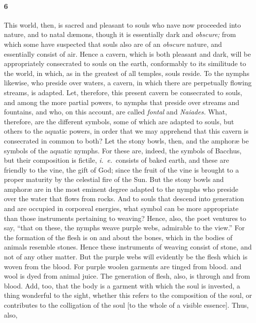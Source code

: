 \documentclass[a4paper,12pt]{article}
\begin{document}
\paragraph{6} This world, then, is sacred and pleasant to souls who nave now
proceeded into nature, and to natal d{\ae}mons, though it is essentially dark
and \textit{obscure;} from which some have suspected that souls also are of an
\textit{obscure} nature, and essentially consist of air. Hence a cavern, which
is both pleasant and dark, will be appropriately consecrated to souls on the
earth, conformably to its similitude to the world, in which, as in the greatest
of all temples, souls reside. To the nymphs likewise, who preside over waters,
a cavern, in which there are perpetually flowing streams, is adapted. Let,
therefore, this present cavern be consecrated to souls, and among the more
partial powers, to nymphs that preside over streams and fountains, and who, on
this account, are called \textit{fontal} and \textit{Naiades.} What, therefore,
are the different symbols, some of which are adapted to souls, but others to
the aquatic powers, in order that we may apprehend that this cavern is
consecrated in common to both? Let the stony bowls, then, and the amphor{\ae}
be symbols of the aquatic nymphs. For these are, indeed, the symbols of
Bacchus, but their composition is fictile, \textit{i.~e.}~consists of baked
earth, and these are friendly to the vine, the gift of God; since the fruit of
the vine is brought to a proper maturity by the celestial fire of the Sun. But
the stony bowls and amphor{\ae} are in the most eminent degree adapted to the
nymphs who preside over the water that flows from rocks. And to souls that
descend into generation and are occupied in corporeal energies, what symbol can
be more appropriate than those instruments pertaining to weaving? Hence, also,
the poet ventures to say, ``that on these, the nymphs weave purple webs,
admirable to the view.'' For the formation of the flesh is on and about the
bones, which in the bodies of animals resemble stones. Hence these instruments
of weaving consist of stone, and not of any other matter. But the purple webs
will evidently be the flesh which is woven from the blood. For purple woolen
garments are tinged from blood. and wool is dyed from animal juice. The
generation of flesh, also, is through and from blood. Add, too, that the body
is a garment with which the soul is invested, a thing wonderful to the sight,
whether this refers to the composition of the soul, or contributes to the
colligation of the soul [to the whole of a visible essence]. Thus, also,
\end{document}
